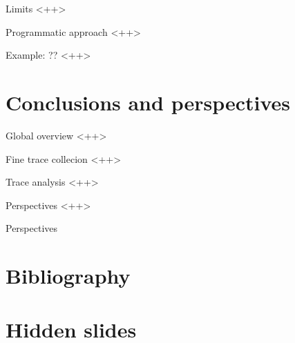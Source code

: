 \documentclass[xcolor={usenames,dvipsnames},hyperref={pdfusetitle}]{beamer}
\begin{document}
\begin{frame}{Limits}
    <++>
\end{frame}

\begin{frame}{Programmatic approach}
    <++>
\end{frame}

\begin{frame}{Example: ??}
    <++>
\end{frame}

\section{Conclusions and perspectives}

\begin{frame}{Global overview}
    \cite{Beniamine15TABARNAC}
    <++>
\end{frame}

\begin{frame}{Fine trace collecion}
    \cite{Beniamine16Moca}
    <++>
\end{frame}

\begin{frame}{Trace analysis}
    <++>
\end{frame}

\begin{frame}{Perspectives}
    <++>
\end{frame}

\setcounter{finalframe}{\value{framenumber}}

\begin{frame}{Perspectives}
\end{frame}

\section*{Bibliography}
%



\section*{Hidden slides}
\end{document}
